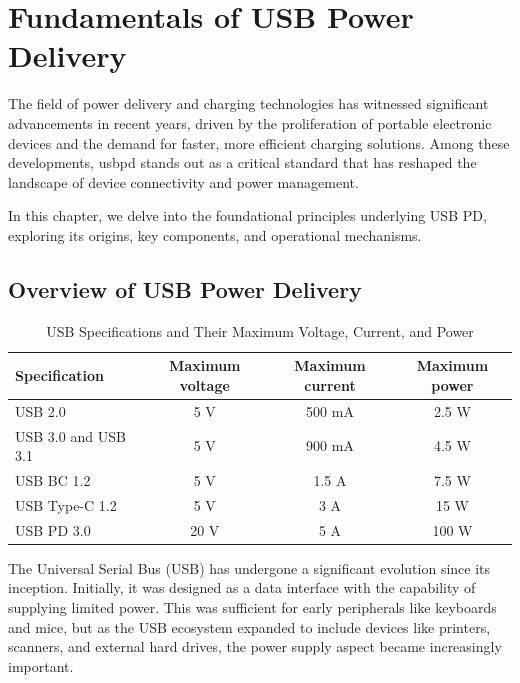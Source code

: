 \chapter{Fundamentals of USB Power Delivery}

The field of power delivery and charging technologies has witnessed significant advancements in recent years, driven by the proliferation of portable electronic devices and the demand for faster, more efficient charging solutions. Among these developments, \gls{usbpd} stands out as a critical standard that has reshaped the landscape of device connectivity and power management.

In this chapter, we delve into the foundational principles underlying USB PD, exploring its origins, key components, and operational mechanisms.

\section{Overview of USB Power Delivery}
 \begin{table}[htb]
    \centering
    \caption{USB Specifications and Their Maximum Voltage, Current, and Power \cite{usb_3.2_products}}
    \label{tab:usb_specifications}  
    \begin{tabular}{|l|c|c|c|}
        \hline
        \textbf{Specification} & \textbf{Maximum voltage} & \textbf{Maximum current} & \textbf{Maximum power} \\
        \hline
        USB 2.0 & 5 V & 500 mA & 2.5 W \\
        \hline
        USB 3.0 and USB 3.1 & 5 V & 900 mA & 4.5 W \\
        \hline
        USB BC 1.2 & 5 V & 1.5 A & 7.5 W \\
        \hline
        USB Type-C 1.2 & 5 V & 3 A & 15 W \\
        \hline
        USB PD 3.0 & 20 V & 5 A & 100 W \\
        \hline
    \end{tabular}
    
\end{table}
The Universal Serial Bus (USB) has undergone a significant evolution since its inception. Initially, it was designed as a data interface with the capability of supplying limited power. This was sufficient for early peripherals like keyboards and mice, but as the USB ecosystem expanded to include devices like printers, scanners, and external hard drives, the power supply aspect became increasingly important. 

